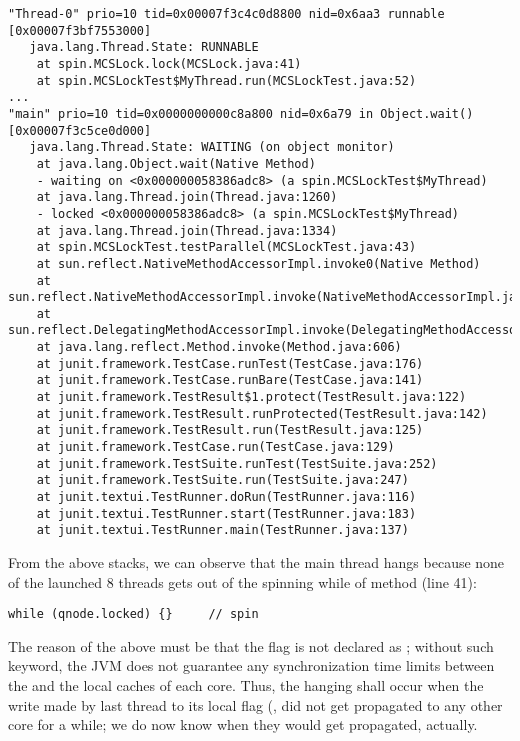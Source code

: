\begin{verbatim}
"Thread-0" prio=10 tid=0x00007f3c4c0d8800 nid=0x6aa3 runnable [0x00007f3bf7553000]
   java.lang.Thread.State: RUNNABLE
	at spin.MCSLock.lock(MCSLock.java:41)
	at spin.MCSLockTest$MyThread.run(MCSLockTest.java:52)
...
"main" prio=10 tid=0x0000000000c8a800 nid=0x6a79 in Object.wait() [0x00007f3c5ce0d000]
   java.lang.Thread.State: WAITING (on object monitor)
	at java.lang.Object.wait(Native Method)
	- waiting on <0x000000058386adc8> (a spin.MCSLockTest$MyThread)
	at java.lang.Thread.join(Thread.java:1260)
	- locked <0x000000058386adc8> (a spin.MCSLockTest$MyThread)
	at java.lang.Thread.join(Thread.java:1334)
	at spin.MCSLockTest.testParallel(MCSLockTest.java:43)
	at sun.reflect.NativeMethodAccessorImpl.invoke0(Native Method)
	at sun.reflect.NativeMethodAccessorImpl.invoke(NativeMethodAccessorImpl.java:57)
	at sun.reflect.DelegatingMethodAccessorImpl.invoke(DelegatingMethodAccessorImpl.java:43)
	at java.lang.reflect.Method.invoke(Method.java:606)
	at junit.framework.TestCase.runTest(TestCase.java:176)
	at junit.framework.TestCase.runBare(TestCase.java:141)
	at junit.framework.TestResult$1.protect(TestResult.java:122)
	at junit.framework.TestResult.runProtected(TestResult.java:142)
	at junit.framework.TestResult.run(TestResult.java:125)
	at junit.framework.TestCase.run(TestCase.java:129)
	at junit.framework.TestSuite.runTest(TestSuite.java:252)
	at junit.framework.TestSuite.run(TestSuite.java:247)
	at junit.textui.TestRunner.doRun(TestRunner.java:116)
	at junit.textui.TestRunner.start(TestRunner.java:183)
	at junit.textui.TestRunner.main(TestRunner.java:137)
\end{verbatim}
\hfill

From the above stacks, we can observe that the main thread hangs
because none of the launched 8 threads gets out of the spinning while
of  method (line 41): \\

\begin{lstlisting}[style=numbers]
      while (qnode.locked) {}     // spin
\end{lstlisting}
\hfill

The reason of the above must be that the  flag is not
declared as ; without such keyword, the JVM does not
guarantee any synchronization time limits between the  and the local
caches of each core. Thus, the hanging shall occur when the write made
by last thread to its local flag (, did not get
propagated to any other core for a while; we do now know when they
would get propagated, actually. \\

